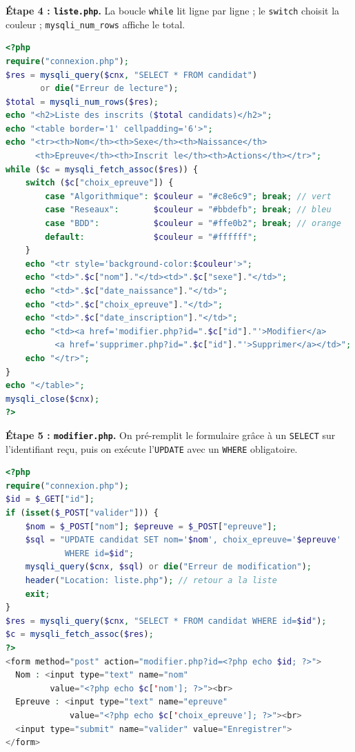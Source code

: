 \documentclass[11pt]{article}
\begin{document}
\begin{exoresolu}
\textbf{Étape 4 : \texttt{liste.php}.} La boucle \texttt{while} lit ligne par ligne ; le \texttt{switch} choisit la couleur ; \texttt{mysqli\_num\_rows} affiche le total.
\begin{lstlisting}[language=Php]
<?php
require("connexion.php");
$res = mysqli_query($cnx, "SELECT * FROM candidat")
       or die("Erreur de lecture");
$total = mysqli_num_rows($res);
echo "<h2>Liste des inscrits ($total candidats)</h2>";
echo "<table border='1' cellpadding='6'>";
echo "<tr><th>Nom</th><th>Sexe</th><th>Naissance</th>
      <th>Epreuve</th><th>Inscrit le</th><th>Actions</th></tr>";
while ($c = mysqli_fetch_assoc($res)) {
    switch ($c["choix_epreuve"]) {
        case "Algorithmique": $couleur = "#c8e6c9"; break; // vert
        case "Reseaux":       $couleur = "#bbdefb"; break; // bleu
        case "BDD":           $couleur = "#ffe0b2"; break; // orange
        default:              $couleur = "#ffffff";
    }
    echo "<tr style='background-color:$couleur'>";
    echo "<td>".$c["nom"]."</td><td>".$c["sexe"]."</td>";
    echo "<td>".$c["date_naissance"]."</td>";
    echo "<td>".$c["choix_epreuve"]."</td>";
    echo "<td>".$c["date_inscription"]."</td>";
    echo "<td><a href='modifier.php?id=".$c["id"]."'>Modifier</a>
          <a href='supprimer.php?id=".$c["id"]."'>Supprimer</a></td>";
    echo "</tr>";
}
echo "</table>";
mysqli_close($cnx);
?>
\end{lstlisting}

\textbf{Étape 5 : \texttt{modifier.php}.} On pré-remplit le formulaire grâce à un \texttt{SELECT} sur l'identifiant reçu, puis on exécute l'\texttt{UPDATE} avec un \texttt{WHERE} obligatoire.
\begin{lstlisting}[language=Php]
<?php
require("connexion.php");
$id = $_GET["id"];
if (isset($_POST["valider"])) {
    $nom = $_POST["nom"]; $epreuve = $_POST["epreuve"];
    $sql = "UPDATE candidat SET nom='$nom', choix_epreuve='$epreuve'
            WHERE id=$id";
    mysqli_query($cnx, $sql) or die("Erreur de modification");
    header("Location: liste.php"); // retour a la liste
    exit;
}
$res = mysqli_query($cnx, "SELECT * FROM candidat WHERE id=$id");
$c = mysqli_fetch_assoc($res);
?>
<form method="post" action="modifier.php?id=<?php echo $id; ?>">
  Nom : <input type="text" name="nom"
         value="<?php echo $c['nom']; ?>"><br>
  Epreuve : <input type="text" name="epreuve"
             value="<?php echo $c['choix_epreuve']; ?>"><br>
  <input type="submit" name="valider" value="Enregistrer">
</form>
\end{lstlisting}


\end{exoresolu}
\end{document}
